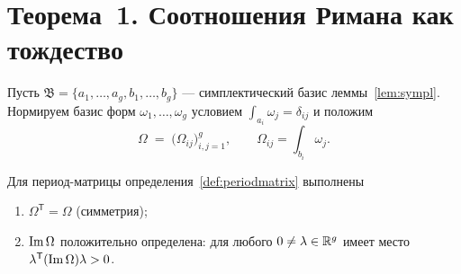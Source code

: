 
\section{Теорема~1. Соотношения Римана как тождество}\label{sec:riemann}

\begin{definition}\label{def:periodmatrix}
Пусть $\mathfrak{B}=\{a_1,\dots,a_g,b_1,\dots,b_g\}$ --- симплектический
базис леммы~\ref{lem:sympl}. Нормируем базис форм
$\omega_1,\dots,\omega_g$ условием $\int_{a_i}\omega_j=\delta_{ij}$ и
положим
\[
  \Omega \;=\; \bigl(\Omega_{ij}\bigr)_{i,j=1}^{g},
  \qquad \Omega_{ij}=\int_{b_i}\omega_j .
\]
\end{definition}

\begin{theorem}\label{th:riemann}
Для период-матрицы определения~\ref{def:periodmatrix} выполнены
\begin{enumerate}[leftmargin=2em, itemsep=0.15em]
\item $\Omega^{\mathsf{T}}=\Omega$ (симметрия);
\item $\operatorname{Im}\Omega$ положительно определена: для любого
  $0\ne\lambda\in\mathbb{R}^g$ имеет место
  $\lambda^{\mathsf{T}}(\operatorname{Im}\Omega)\lambda>0$.
\end{enumerate}
\end{theorem}


